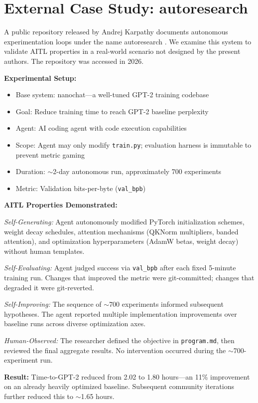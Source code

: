 \documentclass[11pt]{article}
\begin{document}
\section{External Case Study: autoresearch}
\label{sec:casestudy}

A public repository released by Andrej Karpathy documents autonomous experimentation loops under the name autoresearch \citep{karpathy2026autoresearch}. We examine this system to validate AITL properties in a real-world scenario not designed by the present authors. The repository was accessed in 2026.

\textbf{Experimental Setup:}
\begin{itemize}[nosep]
  \item Base system: nanochat---a well-tuned GPT-2 training codebase
  \item Goal: Reduce training time to reach GPT-2 baseline perplexity
  \item Agent: AI coding agent with code execution capabilities
  \item Scope: Agent may only modify \texttt{train.py}; evaluation harness is immutable to prevent metric gaming
  \item Duration: $\sim$2-day autonomous run, approximately 700 experiments
  \item Metric: Validation bits-per-byte (\texttt{val\_bpb})
\end{itemize}

\textbf{AITL Properties Demonstrated:}

\emph{Self-Generating:} Agent autonomously modified PyTorch initialization schemes, weight decay schedules, attention mechanisms (QKNorm multipliers, banded attention), and optimization hyperparameters (AdamW betas, weight decay) without human templates.

\emph{Self-Evaluating:} Agent judged success via \texttt{val\_bpb} after each fixed 5-minute training run. Changes that improved the metric were git-committed; changes that degraded it were git-reverted.

\emph{Self-Improving:} The sequence of $\sim$700 experiments informed subsequent hypotheses. The agent reported multiple implementation improvements over baseline runs across diverse optimization axes.

\emph{Human-Observed:} The researcher defined the objective in \texttt{program.md}, then reviewed the final aggregate results. No intervention occurred during the $\sim$700-experiment run.

\textbf{Result:} Time-to-GPT-2 reduced from 2.02 to 1.80 hours---an 11\% improvement on an already heavily optimized baseline. Subsequent community iterations further reduced this to $\sim$1.65 hours.
\end{document}
